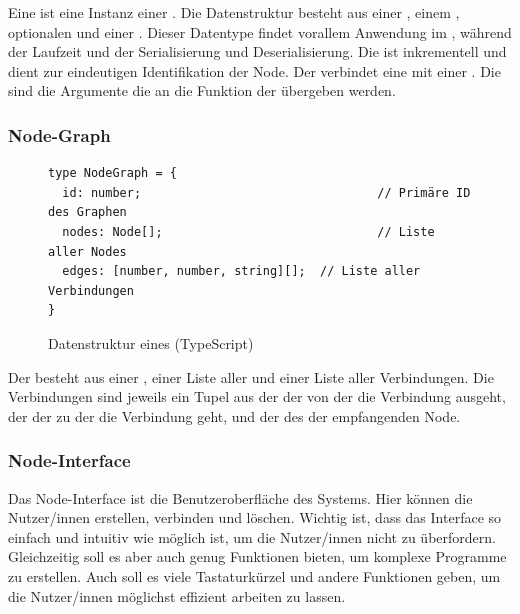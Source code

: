 \documentclass[ngerman]{article}
\begin{document}
Eine  ist eine Instanz einer . Die Datenstruktur besteht aus einer , einem , optionalen  und einer . 
Dieser Datentype findet vorallem Anwendung im , während der Laufzeit und der Serialisierung und Deserialisierung.
\br
Die  ist inkrementell und dient zur eindeutigen Identifikation der Node. Der  verbindet eine  mit einer .
Die  sind die Argumente die an die  Funktion der  übergeben werden.

\subsubsection*{Node-Graph}

\begin{figure}[htbp]
  \begin{code}
    \begin{verbatim}
type NodeGraph = {
  id: number;                                 // Primäre ID des Graphen
  nodes: Node[];                              // Liste aller Nodes
  edges: [number, number, string][];  // Liste aller Verbindungen
}
    \end{verbatim}
  \end{code}

  \caption{Datenstruktur eines  (TypeScript)}
  \label{fig:data_node_graph}

\end{figure}

Der  besteht aus einer , einer Liste aller  und einer Liste aller Verbindungen. 
Die Verbindungen sind jeweils ein Tupel aus der  der  von der die Verbindung ausgeht, der  der  zu der die Verbindung geht, und der  des  der empfangenden Node.

\pagebreak

\subsubsection{Node-Interface}
\label{sec:node_interface}

Das Node-Interface ist die Benutzeroberfläche des Systems. Hier können die Nutzer/innen  erstellen, verbinden und löschen. 
Wichtig ist, dass das Interface so einfach und intuitiv wie möglich ist, um die Nutzer/innen nicht zu überfordern. Gleichzeitig soll es aber auch genug Funktionen bieten, um komplexe Programme zu erstellen. Auch soll es viele Tastaturkürzel und andere Funktionen geben, um die Nutzer/innen möglichst effizient arbeiten zu lassen.
\end{document}
